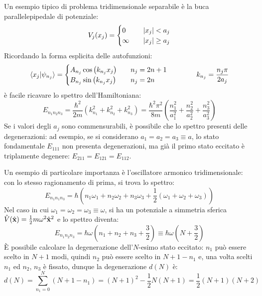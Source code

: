 \begin{example}
	Un esempio tipico di problema tridimensionale separabile è la buca parallelepipedale di potenziale:
	\begin{equation*}
		V_j(x_j) = 
		\begin{cases}
			0 & \quad \left\lvert x_j\right\rvert < a_j\\
			\infty & \quad \left\lvert x_j\right\rvert \ge a_j
		\end{cases}
	\end{equation*}
	Ricordando la forma esplicita delle autofunzioni:
	\begin{equation*}
		\braket{x_j | \psi_{n_j}} =
		\begin{cases}
			A_{n_j} \cos\left(k_{n_j} x_j\right) & \quad n_j = 2n + 1\\
			B_{n_j} \sin\left(k_{n_j} x_j\right) & \quad n_j = 2n\\
		\end{cases}
		\qquad\qquad k_{n_j} = \frac{n_j \pi}{2 a_j}
	\end{equation*}
	è facile ricavare lo spettro dell'Hamiltoniana:
	\begin{equation*}
		E_{n_1 n_2 n_3} = \frac{\hbar^2}{2m} \left(k_{n_1}^2 + k_{n_2}^2 + k_{n_3}^2\right) = \frac{\hbar^2 \pi^2}{8m} \left(\frac{n_1^2}{a_1^2} + \frac{n_2^2}{a_2^2} + \frac{n_3^2}{a_3^2}\right)
	\end{equation*}
	Se i valori degli $ a_j $ sono commensurabili, è possibile che lo spettro presenti delle degenerazioni: ad esempio, se si considerano $ a_1 = a_2 = a_3 \equiv a $, lo stato fondamentale $ E_{111} $ non presenta degenerazioni, ma già il primo stato eccitato è triplamente degenere: $ E_{211} = E_{121} = E_{112} $.
\end{example}

\begin{example}
	Un esempio di particolare importanza è l'oscillatore armonico tridimensionale: con lo stesso ragionamento di prima, si trova lo spettro:
	\begin{equation*}
		E_{n_1 n_1 n_3} = \hbar \left(n_1 \omega_1 + n_2 \omega_2 + n_3 \omega_3 + \frac{1}{2} \left(\omega_1 + \omega_2 + \omega_3\right)\right)
	\end{equation*}
	Nel caso in cui $ \omega_1 = \omega_2 = \omega_3 \equiv \omega $, si ha un potenziale a simmetria sferica $ \hat{V}(\hat{\mathbf{x}}) = \frac{1}{2} m \omega^2 \hat{\mathbf{x}}^2 $ e lo spettro diventa:
	\begin{equation*}
		E_{n_1 n_2 n_3} = \hbar \omega \left(n_1 + n_2 + n_3 + \frac{3}{2}\right) \equiv \hbar \omega \left(N + \frac{3}{2}\right)
	\end{equation*}
	È possibile calcolare la degenerazione dell'$ N $-esimo stato eccitato: $ n_1 $ può essere scelto in $ N + 1 $ modi, quindi $ n_2 $ può essere scelto in $ N + 1 - n_1 $ e, una volta scelti $ n_1 $ ed $ n_2 $, $ n_3 $ è fissato, dunque la degenerazione $ d(N) $ è:
	\begin{equation*}
		d(N) = \displaystyle\sum_{n_1 = 0}^{N} (N + 1 - n_1) = (N + 1)^2 - \frac{1}{2} N (N + 1) = \frac{1}{2} (N + 1) (N + 2)
	\end{equation*}
\end{example}

